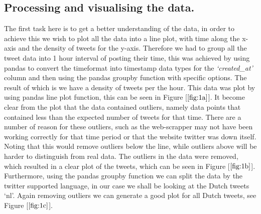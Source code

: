 \documentclass[10pt]{article}
\begin{document}
\subsection{Processing and visualising the data.}
The first task here is to get a better understanding of the data, in order to achieve this
we wish to plot all the data into a line plot, with time along the x-axis and the density
of tweets for the y-axis. Therefore we had to group all the tweet data into 1 hour
interval of
posting their time, this was achieved by using pandas to convert the timeformat into
timestamp data types for the \emph{`created\_at'} column and then using the pandas groupby function with specific options. The
result of which is we have a density of tweets per the hour. This data was plot by using
pandas line plot function, this can be seen in Figure [$\ref{fig:1a}$]. It become clear from the plot that the data contained outliers,
namely data points that contained less than the expected number of tweets for that time. There
are a number of reason for these outliers, such as the web-scrapper may not have been
working correctly for that time period or that the website twitter was down itself. Noting
that this would remove outliers below the line, while outliers above will be harder to
distinguish from real data. The
outliers in the data were removed, which resulted in a clear plot of the tweets, which can
be seen in Figure [$\ref{fig:1b}$]. Furthermore, using the pandas groupby function we can
split the data by the twitter supported language,
in our case we shall be looking at the Dutch tweets `nl'. Again removing outliers we can
generate a good plot for all Dutch tweets, see Figure [$\ref{fig:1c}$].
\end{document}
